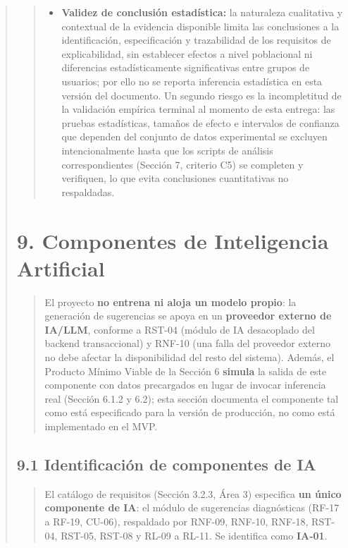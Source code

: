 \documentclass[
]{article}
\begin{document}
\begin{quote}
\begin{quote}
\begin{itemize}
  \item \textbf{Validez de conclusión estadística:} la naturaleza
  cualitativa y contextual de la evidencia disponible limita las
  conclusiones a la identificación, especificación y trazabilidad de
  los requisitos de explicabilidad, sin establecer efectos a nivel
  poblacional ni diferencias estadísticamente significativas entre
  grupos de usuarios; por ello no se reporta inferencia estadística en
  esta versión del documento. Un segundo riesgo es la incompletitud de
  la validación empírica terminal al momento de esta entrega: las
  pruebas estadísticas, tamaños de efecto e intervalos de confianza que
  dependen del conjunto de datos experimental se excluyen
  intencionalmente hasta que los scripts de análisis correspondientes
  (Sección 7, criterio C5) se completen y verifiquen, lo que evita
  conclusiones cuantitativas no respaldadas.
\end{itemize}
\end{quote}

 \section{9. Componentes de Inteligencia Artificial}
\label{s9-componentes-ia}

\begin{quote}
El proyecto \textbf{no entrena ni aloja un modelo propio}: la generación de
sugerencias se apoya en un \textbf{proveedor externo de IA/LLM}, conforme a
RST-04 (módulo de IA desacoplado del backend transaccional) y RNF-10 (una falla
del proveedor externo no debe afectar la disponibilidad del resto del
sistema). Además, el Producto Mínimo Viable de la Sección 6
\textbf{simula} la salida de este componente con datos precargados en lugar de
invocar inferencia real (Sección 6.1.2 y 6.2); esta sección documenta el
componente tal como está especificado para la versión de producción, no como
está implementado en el MVP.
\end{quote}

\subsection{9.1 Identificación de componentes de IA}
\label{s9-1-identificacion}

\begin{quote}
El catálogo de requisitos (Sección 3.2.3, Área 3) especifica
\textbf{un único componente de IA}: el módulo de sugerencias diagnósticas
(RF-17 a RF-19, CU-06), respaldado por RNF-09, RNF-10, RNF-18, RST-04,
RST-05, RST-08 y RL-09 a RL-11. Se identifica como \textbf{IA-01}.


\end{quote}
\end{quote}
\end{document}
